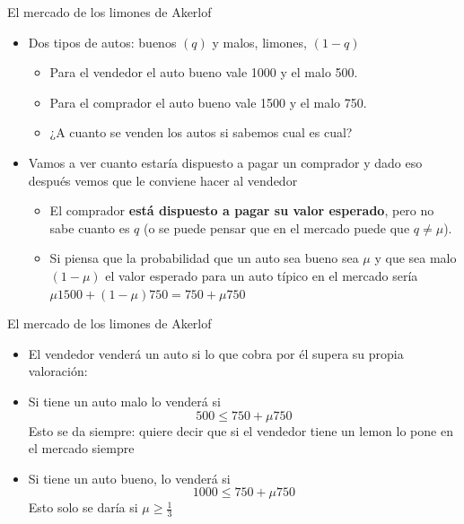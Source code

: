 \documentclass{beamer}
\begin{document}
\begin{frame}{El mercado de los limones de Akerlof}
    \begin{itemize}
        \item Dos tipos de autos: buenos $(q)$ y malos, limones, $(1 - q)$
        \begin{itemize}
            \item Para el vendedor el auto bueno vale 1000 y el malo 500.
            \item Para el comprador el auto bueno vale 1500 y el malo 750.
            \item ¿A cuanto se venden los autos si sabemos cual es cual? 
        \end{itemize}
        \item Vamos a ver cuanto estaría dispuesto a pagar un comprador y dado eso después vemos que le conviene hacer al vendedor
        \begin{itemize}
            \item El comprador \textbf{está dispuesto a pagar su valor esperado}, pero no sabe cuanto es $q$ (o se puede pensar que en el mercado puede que $q \neq \mu$).
            \item Si piensa que la probabilidad que un auto sea bueno sea  $\mu$ y que sea malo  $(1-\mu)$ el valor esperado para un auto típico en el mercado sería  $\mu 1500 + (1-\mu) 750= 750 + \mu 750$ 
        \end{itemize}
    \end{itemize}
\end{frame}

\begin{frame}{El mercado de los limones de Akerlof}
    \begin{itemize}
        \item El vendedor venderá un auto si lo que cobra por él supera su propia valoración:
        \item Si tiene un auto malo lo venderá si 
        \begin{equation*}
            500 \leq 750 + \mu 750
        \end{equation*}
        Esto se da siempre: quiere decir que si el vendedor tiene un lemon lo pone en el mercado siempre
        \item Si tiene un auto bueno, lo venderá si 
        \begin{equation} \label{eq:1}
            1000 \leq 750 + \mu 750
        \end{equation}
        Esto solo se daría si $\mu \geq \frac{1}{3}$
    \end{itemize}
\end{frame}
\end{document}
